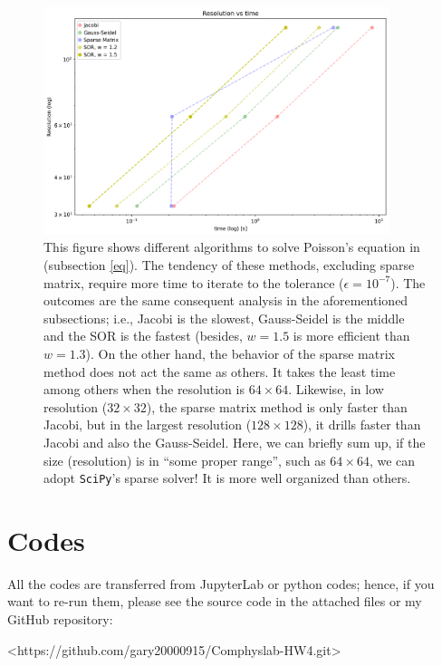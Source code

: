 \documentclass[12pt]{article}
\begin{document}
    \begin{figure}[H]
        \centering
        \includegraphics[width = 0.9\textwidth]{./fig/4.png}
        \caption{This figure shows different algorithms to solve Poisson's equation in (subsection \ref{eq}). The tendency of these methods, excluding sparse matrix, require more time to iterate to the tolerance ($\epsilon = 10^{-7}$). The outcomes are the same consequent analysis in the aforementioned subsections; i.e., Jacobi is the slowest, Gauss-Seidel is the middle and the SOR is the fastest (besides, $w = 1.5$ is more efficient than $w = 1.3$). On the other hand, the behavior of the sparse matrix method does not act the same as others. It takes the least time among others when the resolution is $64 \times 64$. Likewise, in low resolution ($32 \times 32$), the sparse matrix method is only faster than Jacobi, but in the largest resolution ($128 \times 128$), it drills faster than Jacobi and also the Gauss-Seidel. Here, we can briefly sum up, if the size (resolution) is in ``some proper range'', such as $64 \times 64$, we can adopt \texttt{SciPy}'s sparse solver! It is more well organized than others.}\label{q4}
    \end{figure}

\section{Codes}
    All the codes are transferred from JupyterLab or python codes; hence, if you want to re-run them, please see the source code in the attached files or my GitHub repository:

    {\centerline{\ttfamily <https://github.com/gary20000915/Comphyslab-HW4.git>}}
\end{document}

